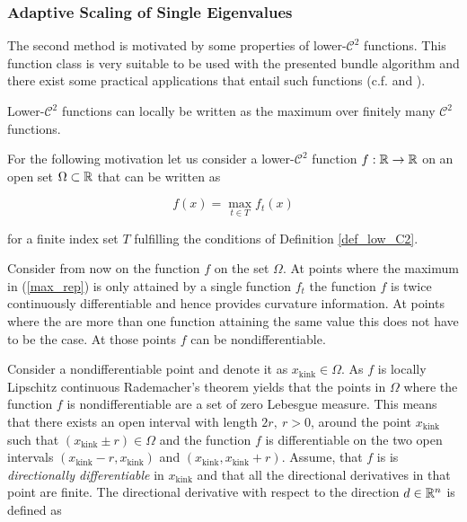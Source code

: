 \subsubsection{Adaptive Scaling of Single Eigenvalues}

The second method is motivated by some properties of lower-\(\mathcal{C}^2\) functions. This function class is very suitable to be used with the presented bundle algorithm and there exist some practical applications that entail such functions (c.f. \cite{Hare2010} and \cite{Hare2016}).

Lower-\(\mathcal{C}^2\) functions can locally be written as the maximum over finitely many \(\mathcal{C}^2\) functions.

For the following motivation let us consider a lower-\(\mathcal{C}^2\) function \(f:\mathbb{R} \to \mathbb{R}\) on an open set \(\Omega \subset \mathbb{R}\) that can be written as

\begin{equation}
	f(x) = \max_{t \in T} f_t(x)
\label{max_rep}
\end{equation}

for a finite index set \(T\) fulfilling the conditions of Definition \ref{def_low_C2}.

Consider from now on the function \(f\) on the set \(\Omega\).
At points where the maximum in (\ref{max_rep}) is only attained by a single function \(f_t\) the function \(f\) is twice continuously differentiable and hence provides curvature information. At points where the are more than one function attaining the same value this does not have to be the case. At those points \(f\) can be nondifferentiable.

Consider a nondifferentiable point and denote it as \(x_{\text{kink}} \in \Omega\).
As \(f\) is locally Lipschitz continuous Rademacher's theorem yields that the points in \(\Omega\) where the function \(f\) is nondifferentiable are a set of zero Lebesgue measure. This means that there exists an open interval with length \(2r, ~r >0 \), around  the point \(x_{\text{kink}}\) such that \((x_{\text{kink}} \pm r) \in \Omega\) and the function \(f\) is differentiable on the two open intervals \((x_{\text{kink}}-r,x_{\text{kink}})\)  and \((x_{\text{kink}},x_{\text{kink}}+r)\). Assume, that \(f\) is is \emph{directionally differentiable} in \(x_{\text{kink}}\) and that all the directional derivatives in that point are finite.
The directional derivative with respect to the direction \(d \in \mathbb{R}^n\) is defined as \cite[p. 213]{Rockafellar1970}

